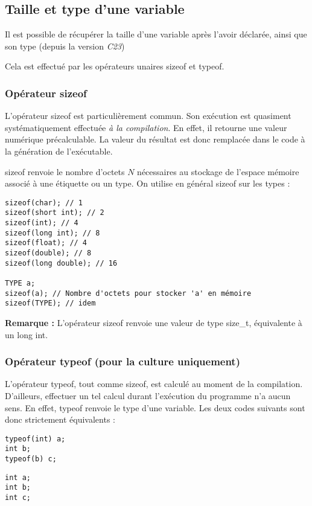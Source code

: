 \documentclass[../../../main.tex]{subfiles}
\begin{document}
\subsection{Taille et type d'une variable}
\label{sub:taille_et_type_d_une_variable}
Il est possible de récupérer la taille d'une variable après l'avoir déclarée, ainsi que son type (depuis la version \textit{C23})
 
Cela est effectué par les opérateurs unaires \textsf{sizeof} et \textsf{typeof}.
 
\subsubsection{Opérateur \textsf{sizeof}}
 \label{ssub:op_rateur_textsf_sizeof}
L'opérateur \textsf{sizeof} est particulièrement commun. Son exécution est quasiment systématiquement effectuée \textit{à la compilation}. En effet, il retourne une valeur numérique précalculable. La valeur du résultat est donc remplacée dans le code à la génération de l'exécutable.
 
\textsf{sizeof} renvoie le nombre d'octets $N$ nécessaires au stockage de l'espace mémoire associé à une étiquette ou un type. On utilise en général \textsf{sizeof} sur les types :
\begin{verbatim}
sizeof(char); // 1
sizeof(short int); // 2
sizeof(int); // 4
sizeof(long int); // 8
sizeof(float); // 4
sizeof(double); // 8
sizeof(long double); // 16

TYPE a;
sizeof(a); // Nombre d'octets pour stocker 'a' en mémoire
sizeof(TYPE); // idem
\end{verbatim}
\textbf{Remarque :} L'opérateur \textsf{sizeof} renvoie une valeur de type \textsf{size\_t}, équivalente à un \textsf{long int}.

\subsubsection{Opérateur \textsf{typeof} (pour la culture uniquement)}
\label{ssub:op_rateur_textsf_typeof}
L'opérateur \textsf{typeof}, tout comme \textsf{sizeof}, est calculé au moment de la compilation. D'ailleurs, effectuer un tel calcul durant l'exécution du programme n'a aucun sens. En effet, \textsf{typeof} renvoie le type d'une variable. Les deux codes suivants sont donc strictement équivalents : 

\begin{minipage}{0.5\textwidth}
\begin{verbatim}
typeof(int) a;
int b;
typeof(b) c;
\end{verbatim}
\end{minipage}
\begin{minipage}{0.5\textwidth}
\begin{verbatim}
int a;
int b;
int c;
\end{verbatim}
\end{minipage}
\end{document}
